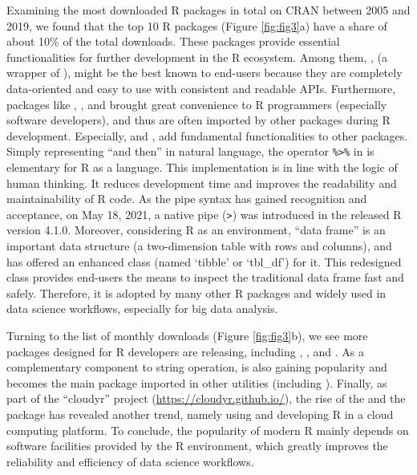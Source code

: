 Examining the most downloaded R packages in total on CRAN between 2005
and 2019, we found that the top 10 R packages (Figure \ref{fig:fig3}a)
have a share of about 10\% of the total downloads. These packages
provide essential functionalities for further development in the R
ecosystem. Among them, ,  (a wrapper
of ),  might be the best known to
end-users because they are completely data-oriented and easy to use with
consistent and readable APIs. Furthermore, packages like ,
,  and  brought great
convenience to R programmers (especially software developers), and thus
are often imported by other packages during R development. Especially,
 and , add fundamental functionalities
to other packages. Simply representing ``and then'' in natural language,
the operator \texttt{\%\textgreater{}\%} in  is
elementary for R as a language. This implementation is in line with the
logic of human thinking. It reduces development time and improves the
readability and maintainability of R code. As the pipe syntax has gained
recognition and acceptance, on May 18, 2021, a native pipe
(\texttt{\textbar{}\textgreater{}}) was introduced in the released R
version 4.1.0. Moreover, considering R as an environment, ``data frame''
is an important data structure (a two-dimension table with rows and
columns), and  has offered an enhanced class (named
`tibble' or `tbl\_df') for it. This redesigned class provides end-users
the means to inspect the traditional data frame fast and safely.
Therefore, it is adopted by many other R packages and widely used in
data science workflows, especially for big data analysis.

Turning to the list of monthly downloads (Figure \ref{fig:fig3}b), we
see more packages designed for R developers are releasing, including
, ,  and
. As a complementary component to string operation,
 is also gaining popularity and becomes the main package
imported in other utilities (including ). Finally, as
part of the ``cloudyr'' project (\url{https://cloudyr.github.io/}), the
rise of the  and the  package
has revealed another trend, namely using and developing R in a cloud
computing platform. To conclude, the popularity of modern R mainly
depends on software facilities provided by the R environment, which
greatly improves the reliability and efficiency of data science
workflows.

